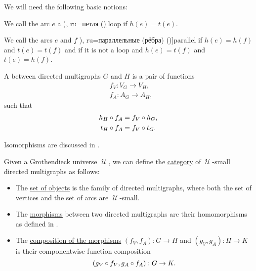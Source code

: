 \begin{definition}
  We will need the following basic notions:
  \begin{thmenum}[resume=def:directed_multigraph]
     We call the arc \( e \) a \term[bg=примка (\cite[7]{Мирчев2001Графи}), ru=петля (\cite[279]{ЕмеличевИПр1990Графы})]{loop} if \( h(e) = t(e) \).

    \medskip

     We call the arcs \( e \) and \( f \) \term[bg=паралелни (ребра) (\cite[7]{Мирчев2001Графи}), ru=параллельные (рёбра) (\cite[279]{ЕмеличевИПр1990Графы})]{parallel} if \( h(e) = h(f) \) and \( t(e) = t(f) \) and  if it is not a loop and \( h(e) = t(f) \) and \( t(e) = h(f) \).

     A  between directed multigraphs \( G \) and \( H \) is a pair of functions
    \begin{align*}
      &f_V: V_G \to V_H, \\
      &f_A: A_G \to A_H,
    \end{align*}
    such that
    \begin{align}
      h_H \bincirc f_A &= f_V \bincirc h_G, \label{eq:def:directed_multigraph/homomorphism/head} \\
      t_H \bincirc f_A &= f_V \bincirc t_G. \label{eq:def:directed_multigraph/homomorphism/tail}
    \end{align}

    Isomorphisms are discussed in .

     Given a Grothendieck universe \( \mscrU \), we can define the \hyperref[def:category]{category} of \( \mscrU \)-small directed multigraphs as follows:
    \begin{itemize}
      \item The \hyperref[def:category/objects]{set of objects} is the family of directed multigraphs, where both the set of vertices and the set of arcs are \( \mscrU \)-small.

      \item The \hyperref[def:category/morphisms]{morphisms} between two directed multigraphs are their homomorphisms as defined in .

      \item The \hyperref[def:category/composition]{composition of the morphisms} \( (f_V, f_A): G \to H \) and \( (g_V, g_A): H \to K \) is their componentwise function composition
      \begin{equation*}
        (g_V \bincirc f_V, g_A \bincirc f_A): G \to K.
      \end{equation*}


\end{itemize}
\end{thmenum}
\end{definition}
